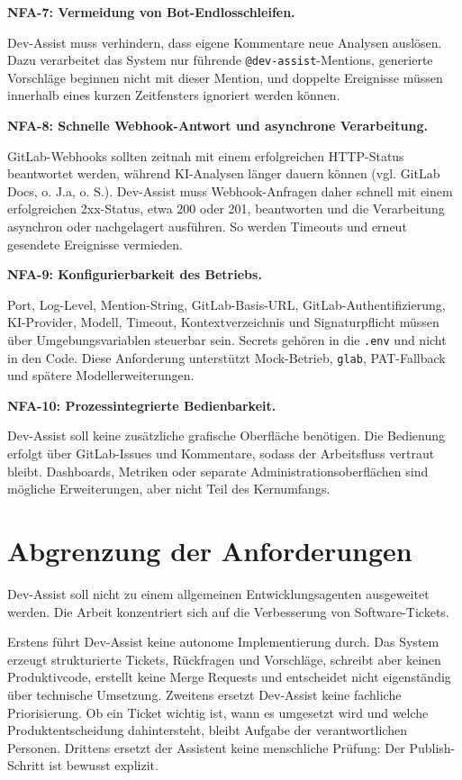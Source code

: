 \documentclass[12pt,a4paper,oneside]{scrreprt}
\begin{document}
\textbf{NFA-7: Vermeidung von Bot-Endlosschleifen.}

Dev-Assist muss verhindern, dass eigene Kommentare neue Analysen auslösen. Dazu verarbeitet das System nur führende \texttt{@dev-assist}-Mentions, generierte Vorschläge beginnen nicht mit dieser Mention, und doppelte Ereignisse müssen innerhalb eines kurzen Zeitfensters ignoriert werden können.

\textbf{NFA-8: Schnelle Webhook-Antwort und asynchrone Verarbeitung.}

GitLab-Webhooks sollten zeitnah mit einem erfolgreichen HTTP-Status beantwortet werden, während KI-Analysen länger dauern können (vgl. GitLab Docs, o. J.a, o. S.). Dev-Assist muss Webhook-Anfragen daher schnell mit einem erfolgreichen 2xx-Status, etwa 200 oder 201, beantworten und die Verarbeitung asynchron oder nachgelagert ausführen. So werden Timeouts und erneut gesendete Ereignisse vermieden.

\textbf{NFA-9: Konfigurierbarkeit des Betriebs.}

Port, Log-Level, Mention-String, GitLab-Basis-URL, GitLab-Authentifizierung, KI-Provider, Modell, Timeout, Kontextverzeichnis und Signaturpflicht müssen über Umgebungsvariablen steuerbar sein. Secrets gehören in die \texttt{.env} und nicht in den Code. Diese Anforderung unterstützt Mock-Betrieb, \texttt{glab}, PAT-Fallback und spätere Modellerweiterungen.

\textbf{NFA-10: Prozessintegrierte Bedienbarkeit.}

Dev-Assist soll keine zusätzliche grafische Oberfläche benötigen. Die Bedienung erfolgt über GitLab-Issues und Kommentare, sodass der Arbeitsfluss vertraut bleibt. Dashboards, Metriken oder separate Administrationsoberflächen sind mögliche Erweiterungen, aber nicht Teil des Kernumfangs.

\section{Abgrenzung der Anforderungen}

Dev-Assist soll nicht zu einem allgemeinen Entwicklungsagenten ausgeweitet werden. Die Arbeit konzentriert sich auf die Verbesserung von Software-Tickets.

Erstens führt Dev-Assist keine autonome Implementierung durch. Das System erzeugt strukturierte Tickets, Rückfragen und Vorschläge, schreibt aber keinen Produktivcode, erstellt keine Merge Requests und entscheidet nicht eigenständig über technische Umsetzung. Zweitens ersetzt Dev-Assist keine fachliche Priorisierung. Ob ein Ticket wichtig ist, wann es umgesetzt wird und welche Produktentscheidung dahintersteht, bleibt Aufgabe der verantwortlichen Personen. Drittens ersetzt der Assistent keine menschliche Prüfung: Der Publish-Schritt ist bewusst explizit.
\end{document}
